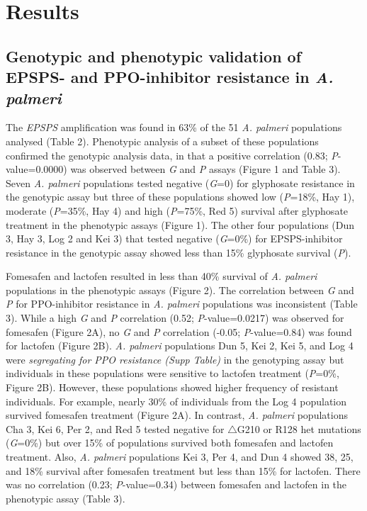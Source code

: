 \documentclass[
  12pt,
  a4paper]{article}
\begin{document}
\hypertarget{results}{%
\section{Results}\label{results}}

\hypertarget{genotypic-and-phenotypic-validation-of-epsps--and-ppo-inhibitor-resistance-in-a.-palmeri-1}{%
\subsection{\texorpdfstring{Genotypic and phenotypic validation of
EPSPS- and PPO-inhibitor resistance in \emph{A.
palmeri}}{Genotypic and phenotypic validation of EPSPS- and PPO-inhibitor resistance in A. palmeri}}\label{genotypic-and-phenotypic-validation-of-epsps--and-ppo-inhibitor-resistance-in-a.-palmeri-1}}

The \emph{EPSPS} amplification was found in 63\% of the 51 \emph{A.
palmeri} populations analysed (Table 2). Phenotypic analysis of a subset
of these populations confirmed the genotypic analysis data, in that a
positive correlation (0.83; \emph{P}-value=0.0000) was observed between
\emph{G} and \emph{P} assays (Figure 1 and Table 3). Seven \emph{A.
palmeri} populations tested negative (\emph{G}=0) for glyphosate
resistance in the genotypic assay but three of these populations showed
low (\emph{P}=18\%, Hay 1), moderate (\emph{P}=35\%, Hay 4) and high
(\emph{P}=75\%, Red 5) survival after glyphosate treatment in the
phenotypic assays (Figure 1). The other four populations (Dun 3, Hay 3,
Log 2 and Kei 3) that tested negative (\emph{G}=0\%) for EPSPS-inhibitor
resistance in the genotypic assay showed less than 15\% glyphosate
survival (\emph{P}).

Fomesafen and lactofen resulted in less than 40\% survival of \emph{A.
palmeri} populations in the phenotypic assays (Figure 2). The
correlation between \emph{G} and \emph{P} for PPO-inhibitor resistance
in \emph{A. palmeri} populations was inconsistent (Table 3). While a
high \emph{G} and \emph{P} correlation (0.52; \emph{P}-value=0.0217) was
observed for fomesafen (Figure 2A), no \emph{G} and \emph{P} correlation
(-0.05; \emph{P}-value=0.84) was found for lactofen (Figure 2B).
\emph{A. palmeri} populations Dun 5, Kei 2, Kei 5, and Log 4 were
\emph{segregating for PPO resistance (Supp Table)} in the genotyping
assay but individuals in these populations were sensitive to lactofen
treatment (\emph{P}=0\%, Figure 2B). However, these populations showed
higher frequency of resistant individuals. For example, nearly 30\% of
individuals from the Log 4 population survived fomesafen treatment
(Figure 2A). In contrast, \emph{A. palmeri} populations Cha 3, Kei 6,
Per 2, and Red 5 tested negative for \(\triangle\)G210 or R128 het
mutations (\emph{G}=0\%) but over 15\% of populations survived both
fomesafen and lactofen treatment. Also, \emph{A. palmeri} populations
Kei 3, Per 4, and Dun 4 showed 38, 25, and 18\% survival after fomesafen
treatment but less than 15\% for lactofen. There was no correlation
(0.23; \emph{P}-value=0.34) between fomesafen and lactofen in the
phenotypic assay (Table 3).
\end{document}
